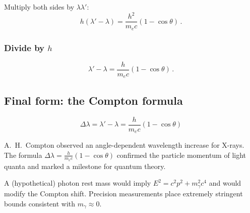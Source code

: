 Multiply both sides by \( \lambda \lambda' \):
\[
h (\lambda' - \lambda) = \frac{h^2}{m_e c} (1 - \cos\theta)\,.
\]

\subsubsection*{Divide by \( h \)}

\[
\lambda' - \lambda = \frac{h}{m_e c} (1 - \cos\theta)\,.
\]

\subsection*{Final form: the Compton formula}

\[
\boxed{
	\Delta \lambda = \lambda' - \lambda = \frac{h}{m_e c} (1 - \cos\theta)
}
\]

\begin{HistoryBox}
	A.\ H.\ Compton observed an angle-dependent wavelength increase for X-rays.
	The formula \(\Delta\lambda=\tfrac{h}{m_ec}(1-\cos\theta)\) confirmed the particle
	momentum of light quanta and marked a milestone for quantum theory.
\end{HistoryBox}

\begin{HypoBox}
	A (hypothetical) photon rest mass would imply \(E^2=c^2p^2+m_\gamma^2c^4\)
	and would modify the Compton shift. Precision measurements place extremely
	stringent bounds consistent with \(m_\gamma\approx 0\).
\end{HypoBox}
